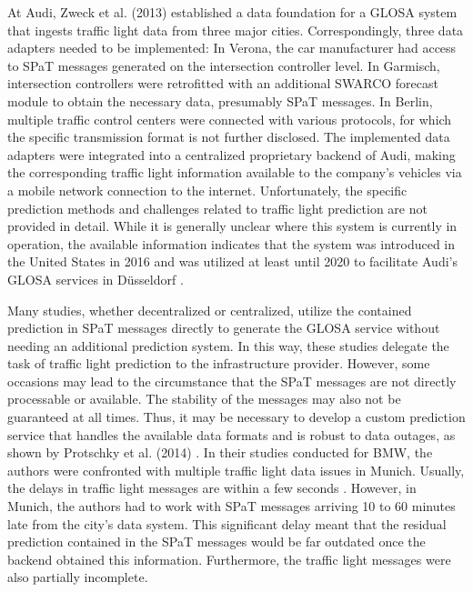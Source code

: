 At Audi, Zweck et al. (2013) \cite{zweck_traffic_2013} established a data foundation for a GLOSA system that ingests traffic light data from three major cities. Correspondingly, three data adapters needed to be implemented: In Verona, the car manufacturer had access to SPaT messages generated on the intersection controller level. In Garmisch, intersection controllers were retrofitted with an additional SWARCO forecast module to obtain the necessary data, presumably SPaT messages. In Berlin, multiple traffic control centers were connected with various protocols, for which the specific transmission format is not further disclosed. The implemented data adapters were integrated into a centralized proprietary backend of Audi, making the corresponding traffic light information available to the company's vehicles via a mobile network connection to the internet. Unfortunately, the specific prediction methods and challenges related to traffic light prediction are not provided in detail. While it is generally unclear where this system is currently in operation, the available information indicates that the system was introduced in the United States in 2016 and was utilized at least until 2020 to facilitate Audi's GLOSA services in Düsseldorf \cite{neuner_leitfaden_2020}.

Many studies, whether decentralized or centralized, utilize the contained prediction in SPaT messages directly to generate the GLOSA service without needing an additional prediction system. In this way, these studies delegate the task of traffic light prediction to the infrastructure provider. However, some occasions may lead to the circumstance that the SPaT messages are not directly processable or available. The stability of the messages may also not be guaranteed at all times. Thus, it may be necessary to develop a custom prediction service that handles the available data formats and is robust to data outages, as shown by Protschky et al. (2014) \cite{protschky_extensive_2014, protschky_adaptive_2014}. In their studies conducted for BMW, the authors were confronted with multiple traffic light data issues in Munich. Usually, the delays in traffic light messages are within a few seconds \cite{neuner_leitfaden_2020}. However, in Munich, the authors had to work with SPaT messages arriving 10 to 60 minutes late from the city's data system. This significant delay meant that the residual prediction contained in the SPaT messages would be far outdated once the backend obtained this information. Furthermore, the traffic light messages were also partially incomplete.

